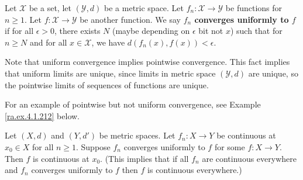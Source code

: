 \begin{definition}

Let \(\mathcal{X}\) be a set, let \((\mathcal{Y}, d)\) be a metric space. Let \(f_n : \mathcal{X} \to \mathcal{Y}\) be functions for \(n \geq 1\). Let \(f: \mathcal{X} \to \mathcal{Y}\) be another function. We say \textbf{\(f_n\) converges uniformly to \(f\)} if for all \(\epsilon > 0\), there exists \(N\) (maybe depending on \(\epsilon\) bit not \(x\)) such that for \( n \geq N\) and for all \(x \in \mathcal{X}\), we have \(d(f_n(x), f(x)) < \epsilon\). 

\end{definition}

\begin{remark}

Note that uniform convergence implies pointwise convergence. This fact implies that uniform limits are unique, since limits in metric space \((\mathcal{Y}, d)\) are unique, so the pointwise limits of sequences of functions are unique.

\end{remark}


For an example of pointwise but not uniform convergence, see Example \ref{ra.ex.4.1.212} below.


\begin{theorem}\label{ra.thm.41.pugh}

Let \((X,d)\) and \((Y, d')\) be metric spaces. Let \(f_n: X \to Y\) be continuous at \(x_0 \in X\) for all \(n \geq 1\). Suppose \(f_n\) converges uniformly to \(f\) for some \(f:X \to Y\). Then \(f\) is continuous at \(x_0\). (This implies that if all \(f_n\) are continuous everywhere and \(f_n\) converges uniformly to \(f\) then \(f\) is continuous everywhere.)

\end{theorem}

